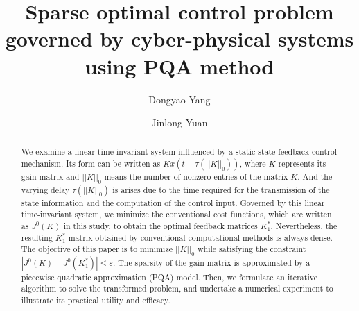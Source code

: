 \documentclass[12pt]{llncs}
\begin{document}
\fi
%
\title{Sparse optimal control problem governed by cyber-physical systems using PQA method}
\author{Dongyao Yang  \and  Jinlong Yuan
}


\maketitle

\begin{abstract}
We examine a linear time-invariant system influenced by a static state feedback control mechanism. Its form can be written as $Kx(t-\tau(||K||_0))$, where $K$ represents its gain matrix and $||K||_0$ means the number of nonzero entries of the matrix $K$. And the varying delay $\tau(||K||_0)$ is arises due to the time required for the transmission of the state information and the computation of the control input. Governed by this linear time-invariant system, we minimize the conventional cost functions, which are written as $J^{0}(K)$ in this study, to obtain the optimal feedback matrices $K_1^{*}$. Nevertheless, the resulting $K_1^{*}$ matrix obtained by conventional computational methods is always dense.
The objective of this paper is to minimize $||K||_0$ while satisfying the constraint $|J^{0}(K)-J^{0}(K_1^{*})|\leq \varepsilon$.
The sparsity of the gain matrix is approximated by a piecewise quadratic approximation (PQA) model.
Then, we formulate an iterative algorithm to solve the transformed problem, and undertake a numerical experiment to illustrate its practical utility and efficacy.
\end{abstract}




\end{document}
